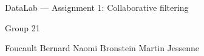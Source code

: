 \documentclass[11pt,a4paper]{article}
\begin{document}
\begin{titlepage}
  \centering
  \vspace*{\fill}
  {\Large DataLab --- Assignment 1: Collaborative filtering\par}
  \vspace{1.5em}
  {\large Group 21\par}
  \vspace{1em}
  Foucault Bernard \quad Naomi Bronstein \quad Martin Jessenne \par
  \vspace*{\fill}
\end{titlepage}

\end{document}
